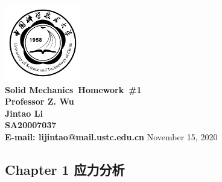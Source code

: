 \documentclass{article}
\makeatletter
\newcommand{\hmwkTitle}{Homework\ \#1}
\newcommand{\hmwkClass}{Solid Mechanics}
\newcommand{\hmwkClassInstructor}{Professor Z. Wu}
\newcommand{\hmwkAuthorName}{\textbf{Jintao Li}}
\newcommand{\hmwkAuthorID}{\textbf{SA20007037}}
\newcommand{\hmwkAuthoremail}{\textbf{E-mail: lijintao@mail.ustc.edu.cn}}
\makeatother
\begin{document}
\begin{titlepage}

\begin{center}

\textcolor{ustcblue}{\includegraphics[width=0.25\textwidth]{./ustc_logo_fig.pdf} \\ [1cm]}
{ \Huge \bfseries \hmwkClass\ \hmwkTitle}\\[1cm]

\large \textbf{\hmwkClassInstructor} \\ [5cm]

\large \hmwkAuthorName \\ [0.25cm]
\large \hmwkAuthorID \\ [0.25cm]
\large \hmwkAuthoremail
\vfill
{\large November 15, 2020}

\end{center}

\end{titlepage}

\begin{center}
\section{Chapter 1 应力分析}
\end{center}
\end{document}
